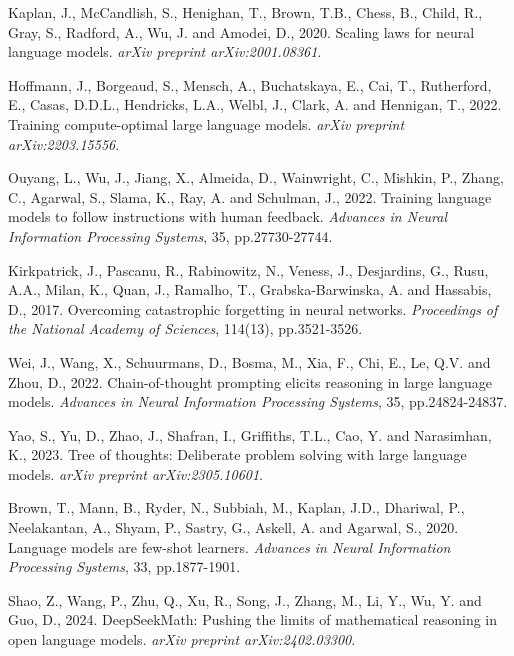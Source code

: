 \documentclass[11pt,a4paper]{article}
\begin{document}

\begin{thebibliography}{99}

Kaplan, J., McCandlish, S., Henighan, T., Brown, T.B., Chess, B., Child, R., Gray, S., Radford, A., Wu, J. and Amodei, D., 2020. Scaling laws for neural language models. \textit{arXiv preprint arXiv:2001.08361}.

Hoffmann, J., Borgeaud, S., Mensch, A., Buchatskaya, E., Cai, T., Rutherford, E., Casas, D.D.L., Hendricks, L.A., Welbl, J., Clark, A. and Hennigan, T., 2022. Training compute-optimal large language models. \textit{arXiv preprint arXiv:2203.15556}.

Ouyang, L., Wu, J., Jiang, X., Almeida, D., Wainwright, C., Mishkin, P., Zhang, C., Agarwal, S., Slama, K., Ray, A. and Schulman, J., 2022. Training language models to follow instructions with human feedback. \textit{Advances in Neural Information Processing Systems}, 35, pp.27730-27744.

Kirkpatrick, J., Pascanu, R., Rabinowitz, N., Veness, J., Desjardins, G., Rusu, A.A., Milan, K., Quan, J., Ramalho, T., Grabska-Barwinska, A. and Hassabis, D., 2017. Overcoming catastrophic forgetting in neural networks. \textit{Proceedings of the National Academy of Sciences}, 114(13), pp.3521-3526.

Wei, J., Wang, X., Schuurmans, D., Bosma, M., Xia, F., Chi, E., Le, Q.V. and Zhou, D., 2022. Chain-of-thought prompting elicits reasoning in large language models. \textit{Advances in Neural Information Processing Systems}, 35, pp.24824-24837.

Yao, S., Yu, D., Zhao, J., Shafran, I., Griffiths, T.L., Cao, Y. and Narasimhan, K., 2023. Tree of thoughts: Deliberate problem solving with large language models. \textit{arXiv preprint arXiv:2305.10601}.

Brown, T., Mann, B., Ryder, N., Subbiah, M., Kaplan, J.D., Dhariwal, P., Neelakantan, A., Shyam, P., Sastry, G., Askell, A. and Agarwal, S., 2020. Language models are few-shot learners. \textit{Advances in Neural Information Processing Systems}, 33, pp.1877-1901.

Shao, Z., Wang, P., Zhu, Q., Xu, R., Song, J., Zhang, M., Li, Y., Wu, Y. and Guo, D., 2024. DeepSeekMath: Pushing the limits of mathematical reasoning in open language models. \textit{arXiv preprint arXiv:2402.03300}.


\end{thebibliography}
\end{document}
